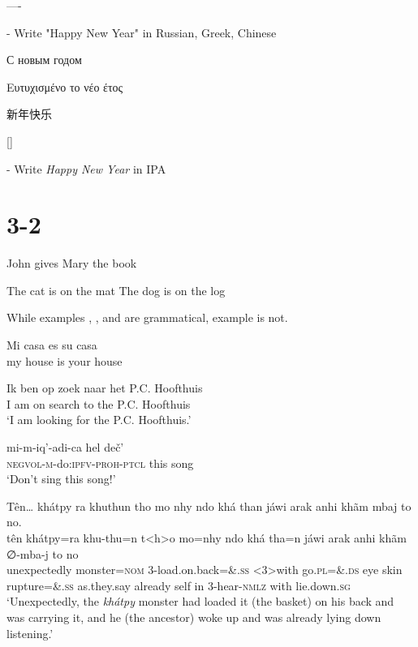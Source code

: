 \documentclass{scrartcl}
\begin{document}
----

- Write "Happy New Year" in Russian, Greek, Chinese 

С новым годом

Ευτυχισμένο το νέο έτος

\newfontfamily{}
\newcommand{\zh}[1]{{\cn #1}} 
{\cn 新年快乐}

[]

 
- Write \textit{Happy New Year} in IPA
\section{3-2} 

\ea\label{ex:john}
John gives Mary the book
\z

\ea\label{ex:cat}
  \ea The cat is on the mat
  \ex The dog is on the log
  \z
\z

\ea
  \z
\z

While examples , , and  are grammatical, example  is not.
 
\ea 
\gll Mi casa es su casa\\
     my house is your house\\
\z

\ea
\gll Ik ben op zoek naar het P.C. Hoofthuis\\
     I  am  on search to the P.C. Hoofthuis\\
\glt `I am looking for the P.C. Hoofthuis.'
\z

\ea
\gll mi-m-iq’-adi-ca            hel deč’\\
\textsc{negvol}-\textsc{m}-do:\textsc{ipfv}-\textsc{proh}-\textsc{ptcl} this  song  \\
\glt   ‘Don’t sing this song!’
\z

\ea
Tên{\dots} khátpy ra khuthun tho mo nhy ndo khá than jáwi arak anhi khãm mbaj to no.\\
\gll   tên           khátpy=ra   khu-thu=n  t<h>o   mo=nhy   ndo khá  tha=n              jáwi        arak    anhi khãm ∅-mba-j             to   no    \\
      unexpectedly monster=\textsc{nom} 3-load.on.back=\&.\textsc{ss} <3>with go.\textsc{pl}=\&.\textsc{ds} eye skin rupture=\&.\textsc{ss} as.they.say already self in   3-hear-\textsc{nmlz} with lie.down.\textsc{sg}\\
\glt ‘Unexpectedly, the \textit{khátpy} monster had loaded it (the basket) on his back and was carrying it, and he (the ancestor) woke up and was already lying down listening.’
\z
\end{document}
